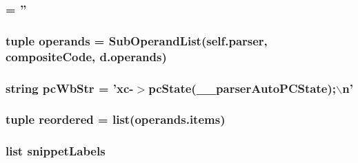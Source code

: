 \label{namespaceisa__parser_a5e9a69b632504688c1674beaebcc950f}
\hypertarget{namespaceisa__parser_a439493fe85dc4056675731bc6214b979}{
\subsubsection[{op\_\-wb\_\-str}]{ = ''}}
\label{namespaceisa__parser_a439493fe85dc4056675731bc6214b979}
\hypertarget{namespaceisa__parser_a1c9c5f3c4208b4329d016f1b16c3cb31}{
\subsubsection[{operands}]{\setlength{\rightskip}{0pt plus 5cm}tuple {\bf operands} = SubOperandList(self.parser, {\bf compositeCode}, d.operands)}}
\label{namespaceisa__parser_a1c9c5f3c4208b4329d016f1b16c3cb31}
\hypertarget{namespaceisa__parser_a6b2a2006e7ddea3921d2bd40e49aed4a}{
\subsubsection[{pcWbStr}]{\setlength{\rightskip}{0pt plus 5cm}string {\bf pcWbStr} = 'xc-\/$>$pcState(\_\-\_\-parserAutoPCState);$\backslash$n'}}
\label{namespaceisa__parser_a6b2a2006e7ddea3921d2bd40e49aed4a}
\hypertarget{namespaceisa__parser_a9d7830b87106f80f05e24edc246122ce}{
\subsubsection[{reordered}]{\setlength{\rightskip}{0pt plus 5cm}tuple {\bf reordered} = list(operands.items)}}
\label{namespaceisa__parser_a9d7830b87106f80f05e24edc246122ce}
\hypertarget{namespaceisa__parser_af5f95d808440c1302a57e2c64df31f1b}{
\subsubsection[{snippetLabels}]{\setlength{\rightskip}{0pt plus 5cm}list {\bf snippetLabels}}}
